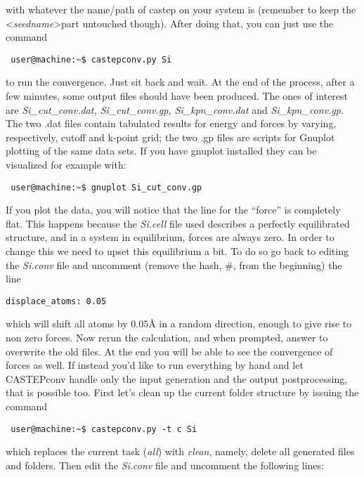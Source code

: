 \documentclass[10pt]{article}
\begin{document}
with whatever the name/path of castep on your system is (remember to keep the \textless \textit{seedname}\textgreater part untouched though). After doing that, you can just use the command

\begin{lstlisting}
 user@machine:~$ castepconv.py Si
\end{lstlisting}

to run the convergence. Just sit back and wait. At the end of the process, after a few minutes, some output files should have been produced. The ones of interest are \textit{Si\_cut\_conv.dat, Si\_cut\_conv.gp, Si\_kpn\_conv.dat} and \textit{Si\_kpn\_conv.gp}. The two .dat files contain tabulated results for energy and forces by varying, respectively, cutoff and k-point grid; the two .gp files are scripts for Gnuplot plotting of the same data sets. If you have gnuplot installed they can be visualized for example with:

\begin{lstlisting}
 user@machine:~$ gnuplot Si_cut_conv.gp
\end{lstlisting}

If you plot the data, you will notice that the line for the ``force'' is completely flat. This happens because the \textit{Si.cell} file used describes a perfectly equilibrated structure, and in a system in equilibrium, forces are always zero. In order to change this we need to upset this equilibrium a bit. To do so go back to editing the \textit{Si.conv} file and uncomment (remove the hash, \#, from the beginning) the line

\begin{lstlisting}
displace_atoms: 0.05
\end{lstlisting}

which will shift all atoms by $0.05 $\AA{} in a random direction, enough to give rise to non zero forces. Now rerun the calculation, and when prompted, answer to overwrite the old files. At the end you will be able to see the convergence of forces as well.\newline
If instead you'd like to run everything by hand and let CASTEPconv handle only the input generation and the output postprocessing, that is possible too. First let's clean up the current folder structure by issuing the command

\begin{lstlisting}
 user@machine:~$ castepconv.py -t c Si
\end{lstlisting}

which replaces the current task (\textit{all}) with \textit{clean}, namely, delete all generated files and folders. Then edit the \textit{Si.conv} file and uncomment the following lines:
\end{document}
